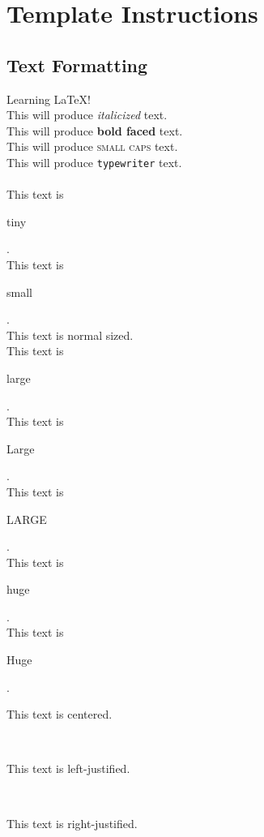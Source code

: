 \section{Template Instructions}\label{sec.templateinstructions}
\thispagestyle{plain}

\subsection{Text Formatting}

Learning \LaTeX{}!\\
This will produce \textit{italicized} text.\\
This will produce \textbf{bold faced} text.\\
This will produce \textsc{small caps} text.\\
This will produce \texttt{typewriter} text.\\
\\
This text is \begin{tiny}tiny\end{tiny}.\\
This text is \begin{small}small\end{small}.\\
This text is normal sized.\\
This text is \begin{large}large\end{large}.\\
This text is \begin{Large}Large\end{Large}.\\
This text is \begin{LARGE}LARGE\end{LARGE}.\\
This text is \begin{huge}huge\end{huge}.\\
This text is \begin{Huge}Huge\end{Huge}.\\
\begin{center}This text is centered.\end{center}\\
\begin{flushleft}This text is left-justified.\end{flushleft}\\
\begin{flushright}This text is right-justified.\end{flushright}\\
